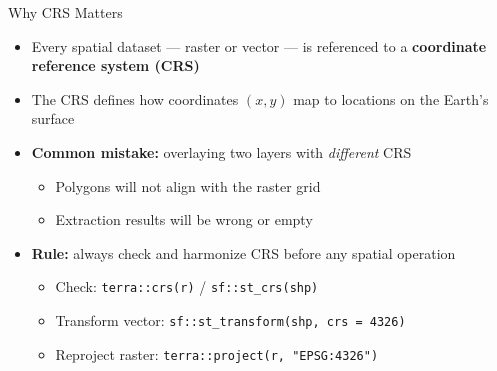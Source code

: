 \documentclass[dvipsnames,hyperref={pdfpagelabels=false}]{beamer}
\begin{document}
\begin{frame}{Why CRS Matters}
\begin{itemize}
  \item Every spatial dataset --- raster or vector --- is referenced
        to a \textbf{coordinate reference system (CRS)}
  \vspace{0.3cm}
  \item The CRS defines how coordinates $(x, y)$ map to locations
        on the Earth's surface
  \vspace{0.3cm}
  \item \textbf{Common mistake:} overlaying two layers with
        \emph{different} CRS
  \vspace{0.15cm}
  \begin{itemize}
    \item Polygons will not align with the raster grid
    \vspace{0.1cm}
    \item Extraction results will be wrong or empty
  \end{itemize}
  \vspace{0.3cm}
  \item \textbf{Rule:} always check and harmonize CRS before any
        spatial operation
  \vspace{0.15cm}
  \begin{itemize}
    \item Check: \texttt{terra::crs(r)} / \texttt{sf::st\_crs(shp)}
    \vspace{0.1cm}
    \item Transform vector: \texttt{sf::st\_transform(shp, crs = 4326)}
    \vspace{0.1cm}
    \item Reproject raster: \texttt{terra::project(r, "EPSG:4326")}
  \end{itemize}
\end{itemize}
\end{frame}
\end{document}
